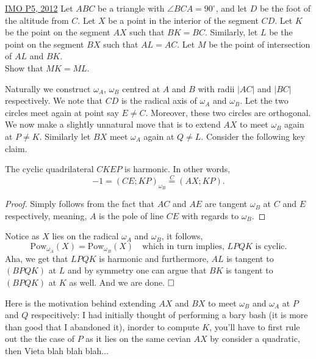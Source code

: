 \begin{problem}{2}{\href{https://artofproblemsolving.com/community/c6h488511p2737425}{IMO P5, 2012}} 
	Let $ABC$ be a triangle with $\angle BCA=90^{\circ}$, and let $D$ be the foot of the altitude from $C$. Let $X$ be a point in the interior of the segment $CD$. Let $K$ be the point on the segment $AX$ such that $BK=BC$. Similarly, let $L$ be the point on the segment $BX$ such that $AL=AC$. Let $M$ be the point of intersection of $AL$ and $BK$.\\
	Show that $MK=ML$.
	\begin{solution} Naturally we construct $\omega_A$, $\omega_B$ centred at $A$ and $B$ with radii $|AC|$ and $|BC|$ respectively. We note that $CD$ is the radical axis of $\omega_A$ and $\omega_B$. Let the two circles meet again at point say $E\neq C$. Moreover, these two circles are orthogonal.\\
	\indent We now make a slightly unnatural move that is to extend $AX$ to meet $\omega_B$ again at $P\neq K$. Similarly let $BX$ meet $\omega_A$ again at $Q\neq L$. Consider the following key claim.

		\begin{numclaim}{1}
			The cyclic quadrilateral $CKEP$ is harmonic. In other words,
			$$-1=(CE; KP)_{\omega_B}\overset{C}{=}(AX; KP).$$
		\end{numclaim}
	\begin{proof}
		Simply follows from the fact that $AC$ and $AE$ are tangent $\omega_B$ at $C$ and $E$ respectively, meaning, $A$ is the pole of line $CE$ with regards to $\omega_B$.
	\end{proof}

	\noindent Notice as $X$ lies on the radical $\omega_A$ and $\omega_B$, it follows, 
	$$\text{Pow}_{\omega_A}(X)=\text{Pow}_{\omega_B}(X)\quad\text{which in turn implies, $LPQK$ is cyclic.}$$
	Aha, we get that $LPQK$ is harmonic and furthermore, $AL$ is tangent to $(BPQK)$ at $L$ and by symmetry one can argue that $BK$ is tangent to $(BPQK)$ at $K$ as well. And we are done. $\qedwhite$\\
	
	\begin{remark}
	Here is the motivation behind extending $AX$ and $BX$ to meet $\omega_B$ and $\omega_A$ at $P$ and $Q$  respecitively: I had initially thought of performing a bary bash (it is more than good that I abandoned it), inorder to compute $K$, you'll have to first rule out the the case of $P$ as it lies on the same cevian $AX$ by consider a quadratic, then Vieta blah blah blah...
	\end{remark}
	\end{solution}
\end{problem}
	
